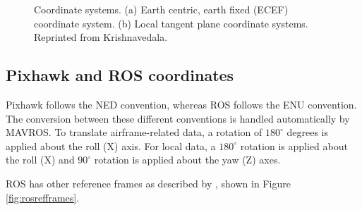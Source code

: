 \begin{figure}%
	\centering
	\caption[ECEF coordinate system]{\small Coordinate systems. (a) Earth centric, earth fixed (ECEF) coordinate system. (b) Local tangent plane coordinate systems. Reprinted from Krishnavedala. 
	}%
	\label{fig:coordinatesystem}%
\end{figure}

\subsection{Pixhawk and ROS coordinates}

Pixhawk follows the NED convention, whereas ROS follows the ENU convention. The conversion between these different conventions is handled automatically by MAVROS. To translate airframe-related data, a rotation of $180^{\circ}$ degrees is applied about the roll (X) axis. For local data, a $180^{\circ}$ rotation is applied about the roll (X) and $90^{\circ}$ rotation is applied about the yaw (Z) axes.

ROS has other reference frames as described by , shown in Figure \ref{fig:rosrefframes}.

